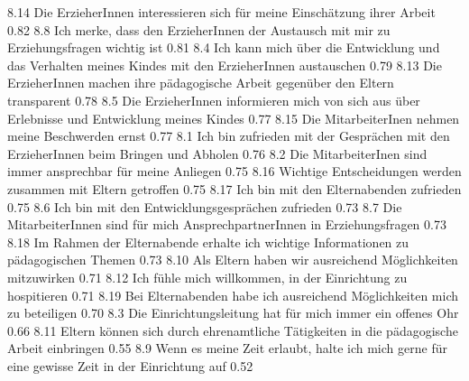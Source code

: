 \documentclass[12pt,a4paper]{article}
\begin{document}
8.14 Die ErzieherInnen interessieren sich für meine Einschätzung
        ihrer Arbeit                                                                                            0.82
8.8 Ich merke, dass den ErzieherInnen der Austausch mit mir zu
      Erziehungsfragen wichtig ist                                                                   0.81   
8.4 Ich kann mich über die Entwicklung und das Verhalten
      meines Kindes mit den ErzieherInnen austauschen                                0.79
8.13 Die ErzieherInnen machen ihre pädagogische Arbeit gegenüber
        den Eltern transparent                                                                            0.78
8.5 Die ErzieherInnen informieren mich von sich aus über Erlebnisse
      und Entwicklung meines Kindes                                                             0.77
8.15 Die MitarbeiterInen nehmen meine Beschwerden ernst                        0.77
8.1 Ich bin zufrieden mit der Gesprächen mit den ErzieherInnen
      beim Bringen und Abholen	                                                               0.76
8.2 Die MitarbeiterInen sind immer ansprechbar für meine Anliegen           0.75
8.16 Wichtige Entscheidungen werden zusammen mit Eltern
        getroffen                                                                                                  0.75
8.17 Ich bin mit den Elternabenden zufrieden                                                0.75
8.6 Ich bin mit den Entwicklungsgesprächen zufrieden                                 0.73  
8.7 Die MitarbeiterInnen sind für mich AnsprechpartnerInnen in             
      Erziehungsfragen                                                                                       0.73
8.18 Im Rahmen der Elternabende erhalte ich wichtige Informationen
        zu pädagogischen Themen                                                                      0.73
8.10 Als Eltern haben wir ausreichend Möglichkeiten mitzuwirken              0.71
8.12 Ich fühle mich willkommen, in der Einrichtung zu hospitieren              0.71
8.19 Bei Elternabenden habe ich ausreichend Möglichkeiten
        mich zu beteiligen                                                                                   0.70
8.3 Die Einrichtungsleitung hat für mich immer ein offenes Ohr                   0.66         
8.11 Eltern können sich durch ehrenamtliche Tätigkeiten in die
        pädagogische Arbeit einbringen                                                              0.55
8.9 Wenn es meine Zeit erlaubt, halte ich mich gerne für eine
      gewisse Zeit in der Einrichtung auf                                                          0.52
\end{document}
